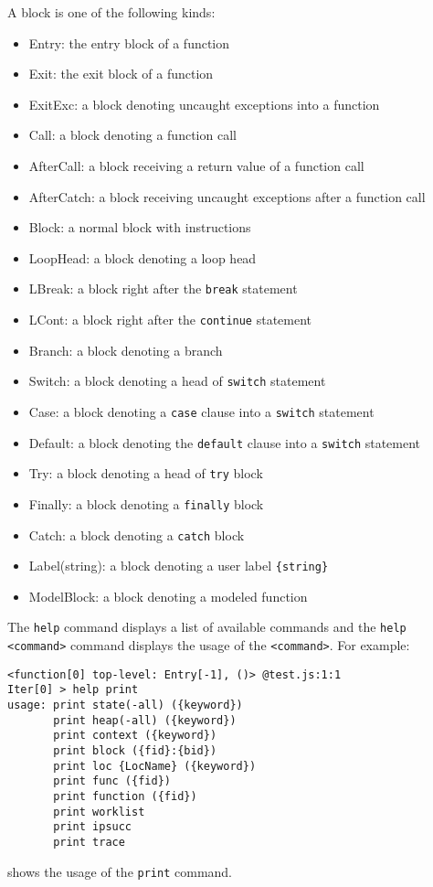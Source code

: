 A block is one of the following kinds:
\begin{itemize}
\itemsep-.1em
\item Entry: the entry block of a function
\item Exit: the exit block of a function
\item ExitExc: a block denoting uncaught exceptions into a function
\item Call: a block denoting a function call
\item AfterCall: a block receiving a return value of a function call
\item AfterCatch: a block receiving uncaught exceptions after a function call
\item Block: a normal block with instructions
\item LoopHead: a block denoting a loop head
\item LBreak: a block right after the \verb!break! statement
\item LCont: a block right after the \verb!continue! statement
\item Branch: a block denoting a branch
\item Switch: a block denoting a head of \verb!switch! statement
\item Case: a block denoting a \verb!case! clause into a \verb!switch! statement
\item Default: a block denoting the \verb!default! clause
  into a \verb!switch! statement
\item Try: a block denoting a head of \verb!try! block
\item Finally: a block denoting a \verb!finally! block
\item Catch: a block denoting a \verb!catch! block
\item Label({string}): a block denoting a user label \verb!{string}!
\item ModelBlock: a block denoting a modeled function
\end{itemize}

The \verb!help! command displays a list of available commands and
the \verb!help <command>! command displays the usage of the \verb!<command>!.
For example:
{\small
\begin{verbatim}
<function[0] top-level: Entry[-1], ()> @test.js:1:1
Iter[0] > help print
usage: print state(-all) ({keyword})
       print heap(-all) ({keyword})
       print context ({keyword})
       print block ({fid}:{bid})
       print loc {LocName} ({keyword})
       print func ({fid})
       print function ({fid})
       print worklist
       print ipsucc
       print trace
\end{verbatim}
}
\noindent
shows the usage of the \verb!print! command.

